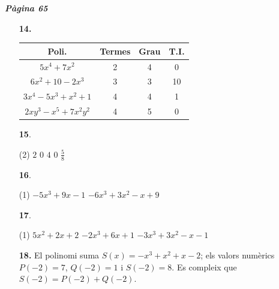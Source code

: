 \documentclass[a4paper, pdf, twoside]{book}
\begin{document}
\begin{multicols}{2}

{\textbf{\em Pàgina 65}} \hrulefill
\begin{enumerate}
\vspace{0.25cm}
\item[\fontfamily{phv}\selectfont\color{blue}\textbf{14. }] 
\par \begin {tabular}{|c|c|c|c|} \hline \rowcolor {lightgray} Poli. & Termes & Grau & T.I. \\ \hline $5x^{4} +7x^{2}$ & 2 & 4 & 0 \\ \hline $6x^{2} +10-2x^{3} $ & 3 & 3 & 10 \\ \hline $3x^{4}-5x^{3}+x^2+1 $ & 4 & 4 & 1 \\ \hline $2xy^{3} -x^{5} +7x^{2} y^{2}$ & 4 & 5 & 0 \\ \hline \end {tabular}
 \end{enumerate}
\begin{enumerate}
\vspace{0.25cm}



 \item[\fontfamily{phv}\selectfont\color{blue}\textbf{15}. ] 
 \begin{tasks}[column-sep=1em, item-indent=1.3333em](2)
	 \task $2$
	 \task $0$
	 \task $4$
	 \task $0$
	 \task $\frac {5}{8}$
\end{tasks}
\vspace{0.25cm}



 \item[\fontfamily{phv}\selectfont\color{blue}\textbf{16}. ] 
 \begin{tasks}[column-sep=1em, item-indent=1.3333em](1)
	 \task $-5x^3+9x-1$
	 \task $-6x^3+3x^2-x+9$
\end{tasks}
\vspace{0.25cm}



 \item[\fontfamily{phv}\selectfont\color{blue}\textbf{17}. ] 
 \begin{tasks}[column-sep=1em, item-indent=1.3333em](1)
	 \task $5x^2+2x+2$
	 \task $-2x^3+6x+1$
	 \task $-3x^3+3x^2-x-1$
\end{tasks}
\vspace{0.25cm}
\item[\fontfamily{phv}\selectfont\color{blue}\textbf{18. }] 
El polinomi suma $S(x)=-x^3+x^2+x-2$; els valors numèrics $P(-2)=7$, $Q(-2)=1$ i $S(-2)=8$. Es compleix que $S(-2)=P(-2)+Q(-2)$. 
\vspace{0.25cm}



\end{enumerate}
\end{multicols}
\end{document}
